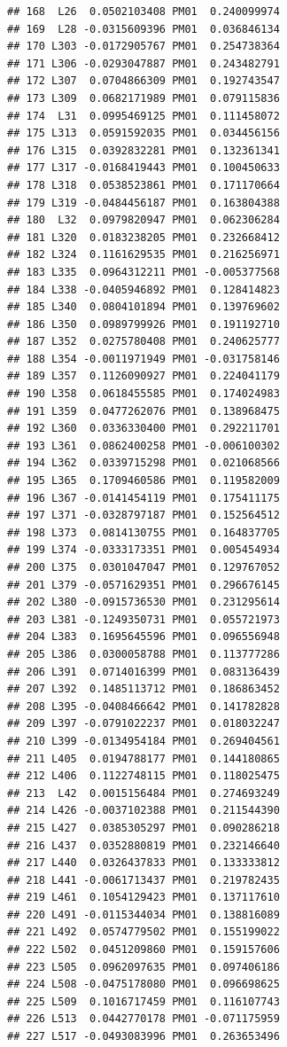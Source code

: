 \documentclass[
]{article}
\begin{document}
\begin{verbatim}
## 168  L26  0.0502103408 PM01  0.240099974
## 169  L28 -0.0315609396 PM01  0.036846134
## 170 L303 -0.0172905767 PM01  0.254738364
## 171 L306 -0.0293047887 PM01  0.243482791
## 172 L307  0.0704866309 PM01  0.192743547
## 173 L309  0.0682171989 PM01  0.079115836
## 174  L31  0.0995469125 PM01  0.111458072
## 175 L313  0.0591592035 PM01  0.034456156
## 176 L315  0.0392832281 PM01  0.132361341
## 177 L317 -0.0168419443 PM01  0.100450633
## 178 L318  0.0538523861 PM01  0.171170664
## 179 L319 -0.0484456187 PM01  0.163804388
## 180  L32  0.0979820947 PM01  0.062306284
## 181 L320  0.0183238205 PM01  0.232668412
## 182 L324  0.1161629535 PM01  0.216256971
## 183 L335  0.0964312211 PM01 -0.005377568
## 184 L338 -0.0405946892 PM01  0.128414823
## 185 L340  0.0804101894 PM01  0.139769602
## 186 L350  0.0989799926 PM01  0.191192710
## 187 L352  0.0275780408 PM01  0.240625777
## 188 L354 -0.0011971949 PM01 -0.031758146
## 189 L357  0.1126090927 PM01  0.224041179
## 190 L358  0.0618455585 PM01  0.174024983
## 191 L359  0.0477262076 PM01  0.138968475
## 192 L360  0.0336330400 PM01  0.292211701
## 193 L361  0.0862400258 PM01 -0.006100302
## 194 L362  0.0339715298 PM01  0.021068566
## 195 L365  0.1709460586 PM01  0.119582009
## 196 L367 -0.0141454119 PM01  0.175411175
## 197 L371 -0.0328797187 PM01  0.152564512
## 198 L373  0.0814130755 PM01  0.164837705
## 199 L374 -0.0333173351 PM01  0.005454934
## 200 L375  0.0301047047 PM01  0.129767052
## 201 L379 -0.0571629351 PM01  0.296676145
## 202 L380 -0.0915736530 PM01  0.231295614
## 203 L381 -0.1249350731 PM01  0.055721973
## 204 L383  0.1695645596 PM01  0.096556948
## 205 L386  0.0300058788 PM01  0.113777286
## 206 L391  0.0714016399 PM01  0.083136439
## 207 L392  0.1485113712 PM01  0.186863452
## 208 L395 -0.0408466642 PM01  0.141782828
## 209 L397 -0.0791022237 PM01  0.018032247
## 210 L399 -0.0134954184 PM01  0.269404561
## 211 L405  0.0194788177 PM01  0.144180865
## 212 L406  0.1122748115 PM01  0.118025475
## 213  L42  0.0015156484 PM01  0.274693249
## 214 L426 -0.0037102388 PM01  0.211544390
## 215 L427  0.0385305297 PM01  0.090286218
## 216 L437  0.0352880819 PM01  0.232146640
## 217 L440  0.0326437833 PM01  0.133333812
## 218 L441 -0.0061713437 PM01  0.219782435
## 219 L461  0.1054129423 PM01  0.137117610
## 220 L491 -0.0115344034 PM01  0.138816089
## 221 L492  0.0574779502 PM01  0.155199022
## 222 L502  0.0451209860 PM01  0.159157606
## 223 L505  0.0962097635 PM01  0.097406186
## 224 L508 -0.0475178080 PM01  0.096698625
## 225 L509  0.1016717459 PM01  0.116107743
## 226 L513  0.0442770178 PM01 -0.071175959
## 227 L517 -0.0493083996 PM01  0.263653496

\end{verbatim}
\end{document}
